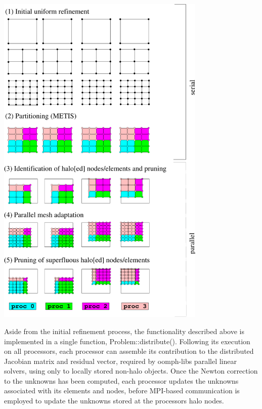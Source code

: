  
\begin{DoxyImage}
\includegraphics[width=0.75\textwidth]{decomposition}
\end{DoxyImage}


Aside from the initial refinement process, the functionality described above is implemented in a single function, {\ttfamily Problem\+::distribute()}. Following its execution on all processors, each processor can assemble its contribution to the distributed Jacobian matrix and residual vector, required by {\ttfamily oomph-\/lib\textquotesingle{}s} parallel linear solvers, using only to locally stored non-\/halo objects. Once the Newton correction to the unknowns has been computed, each processor updates the unknowns associated with its elements and nodes, before M\+P\+I-\/based communication is employed to update the unknowns stored at the processors\textquotesingle{} halo nodes.

